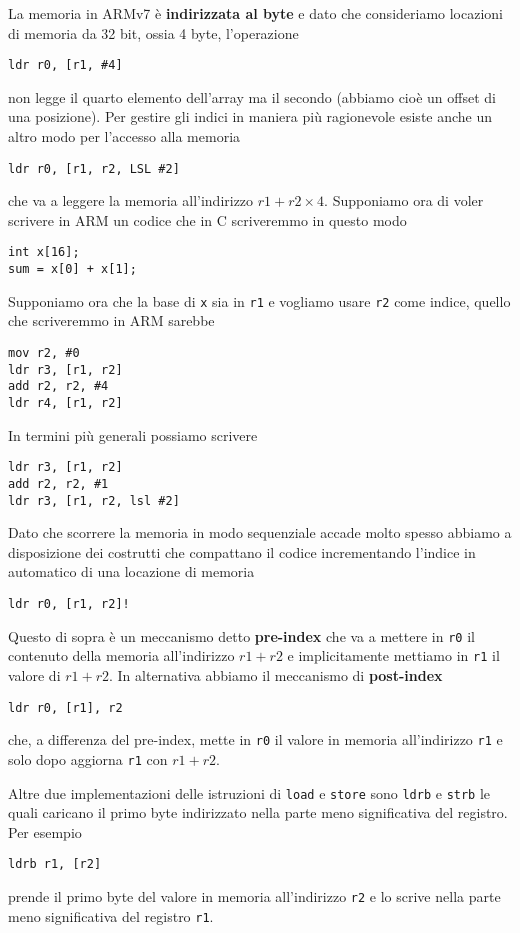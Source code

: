 La memoria in ARMv7 è \textbf{indirizzata al byte} e dato che consideriamo locazioni di memoria da
32 bit, ossia 4 byte, l'operazione
\begin{verbatim}
ldr r0, [r1, #4]
\end{verbatim}
non legge il quarto elemento dell'array ma il secondo (abbiamo cioè un offset di una posizione).
Per gestire gli indici in maniera più ragionevole esiste anche un altro modo per l'accesso alla
memoria
\begin{verbatim}
ldr r0, [r1, r2, LSL #2]
\end{verbatim}
che va a leggere la memoria all'indirizzo $r1 + r2 \times 4$. Supponiamo ora di voler scrivere in
ARM un codice che in C scriveremmo in questo modo
\begin{verbatim}
int x[16];
sum = x[0] + x[1];	
\end{verbatim}
Supponiamo ora che la base di \verb|x| sia in \verb|r1| e vogliamo usare \verb|r2| come indice,
quello che scriveremmo in ARM sarebbe
\begin{verbatim}
mov r2, #0
ldr r3, [r1, r2]
add r2, r2, #4
ldr r4, [r1, r2]
\end{verbatim}
In termini più generali possiamo scrivere
\begin{verbatim}
ldr r3, [r1, r2]
add r2, r2, #1
ldr r3, [r1, r2, lsl #2]
\end{verbatim}
Dato che scorrere la memoria in modo sequenziale accade molto spesso abbiamo a disposizione dei
costrutti che compattano il codice incrementando l'indice in automatico di una locazione di memoria
\begin{verbatim}
ldr r0, [r1, r2]!
\end{verbatim}
Questo di sopra è un meccanismo detto \textbf{pre-index} che va a mettere in \verb|r0| il contenuto
della memoria all'indirizzo $r1 + r2$ e implicitamente mettiamo in \verb|r1| il valore di $r1 + r2$.
In alternativa abbiamo il meccanismo di \textbf{post-index}
\begin{verbatim}
ldr r0, [r1], r2
\end{verbatim}
che, a differenza del pre-index, mette in \verb|r0| il valore in memoria all'indirizzo \verb|r1| e
solo dopo aggiorna \verb|r1| con $r1 + r2$.

Altre due implementazioni delle istruzioni di \verb|load| e \verb|store| sono \verb|ldrb| e
\verb|strb| le quali caricano il primo byte indirizzato nella parte meno significativa del
registro. Per esempio
\begin{verbatim}
ldrb r1, [r2]
\end{verbatim}
prende il primo byte del valore in memoria all'indirizzo \verb|r2| e lo scrive nella parte meno
significativa del registro \verb|r1|.

